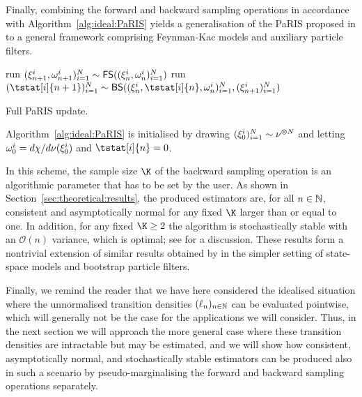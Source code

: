Finally, combining the forward and backward sampling operations in accordance with Algorithm~\ref{alg:ideal:PaRIS} yields a generalisation of the PaRIS proposed in \cite{olsson:westerborn:2014b} to a general framework comprising Feynman-Kac models and auxiliary particle filters. 

\begin{algorithm}[h] 
    run $(\xi_{n + 1}^{i}, \omega_{n + 1}^{i})_{i = 1}^N \sim \mathsf{FS}((\xi_{n}^{i}, \omega_{n}^{i})_{i = 1}^N)$\;
    run $(\tstat[i]{n + 1})_{i = 1}^\N \sim \mathsf{BS}((\epart{n}{i}, \tstat[i]{n}, \ewght{n}{i})_{i = 1}^\N, (\epart{n + 1}{i})_{i = 1}^\N)$\;
    \medskip
\caption{Full PaRIS update.} \label{alg:ideal:PaRIS}
\end{algorithm}

Algorithm~\ref{alg:ideal:PaRIS} is initialised by drawing $(\xi_{0}^{i})_{i = 1}^N \sim \nu^{\varotimes N}$ and letting $\omega_{0}^{i} = d \chi / d \nu(\xi_{0}^{i})$ and $\tstat[i]{n} = 0$.  

In this scheme, the sample size $\K$ of the backward sampling operation is an algorithmic parameter that has to be set by the user. As shown in Section~\ref{sec:theoretical:results}, the produced estimators are, for all $n \in \mathbb{N}$, consistent and asymptotically normal for any fixed $\K$ larger than or equal to one. In addition, for any fixed $\K \geq 2$ the algorithm is stochastically stable with an $\mathcal{O}(n)$ variance, which is optimal; see \cite[Section~1]{olsson:westerborn:2014b} for a discussion. These results form a nontrivial extension of similar results obtained by \cite{olsson:westerborn:2014b} in the simpler setting of state-space models and bootstrap particle filters. 

Finally, we remind the reader that we have here considered the idealised situation where the unnormalised transition densities $(\ell_{n})_{n \in \mathbb{N}}$ can be evaluated pointwise, which will generally not be the case for the applications we will consider. Thus, in the next section we will approach the more general case where these transition densities are intractable but may be estimated, and we will show how consistent, asymptotically normal, and stochastically stable estimators can be produced also in such a scenario by pseudo-marginalising the forward and backward sampling operations separately. 
 
